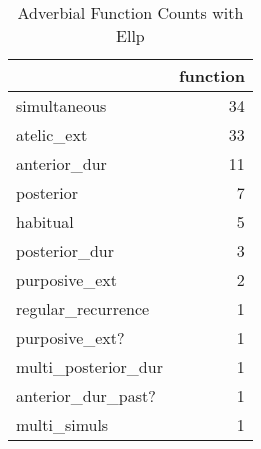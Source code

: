 \begin{table}[htbp!]
\centering
\caption{Adverbial Function Counts with Ellp}
\label{table:Ellp_funct_ct}
\begin{tabular}{lr}
\toprule
{} &  function \\
\midrule
simultaneous        &        34 \\
atelic\_ext          &        33 \\
anterior\_dur        &        11 \\
posterior           &         7 \\
habitual            &         5 \\
posterior\_dur       &         3 \\
purposive\_ext       &         2 \\
regular\_recurrence  &         1 \\
purposive\_ext?      &         1 \\
multi\_posterior\_dur &         1 \\
anterior\_dur\_past?  &         1 \\
multi\_simuls        &         1 \\
\bottomrule
\end{tabular}
\end{table}
